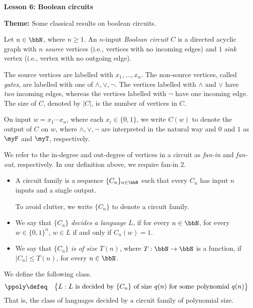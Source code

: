 \documentclass[11pt, a4paper]{article}
\renewcommand{\lesson}{6}
\renewcommand{\lessontitle}{Boolean circuits}
\renewcommand{\fulltitle}{Lesson \lesson: \lessontitle}
\begin{document}
\date{}



\begin{center}
{\Large {\bf \fulltitle}}
\end{center}
\vspace{0.5cm}

\noindent
{\bf Theme:} Some classical results on boolean circuits.

\vspace{0.5cm}


Let $n\in \bbN$, where $n\geq 1$.
An $n$-input {\em Boolean circuit} $C$ is a directed acyclic graph with
$n$ {\em source} vertices (i.e., vertices with no incoming edges) and 
$1$ {\em sink} vertex (i.e., vertex with no outgoing edge).

The source vertices are labelled with $x_1,\ldots,x_n$.
The non-source vertices, called {\em gates},
are labelled with one of $\wedge, \vee,\neg$.
The vertices labelled with $\wedge$ and $\vee$ have {\em two} incoming edges,
whereas the vertices labelled with $\neg$ have one incoming edge.
The size of $C$, denoted by $|C|$, is the number of vertices in $C$.

On input $w = x_1\cdots x_n$, where each $x_i \in \{0,1\}$,
we write $C(w)$ to denote the output of $C$ on $w$,
where $\wedge,\vee,\neg$ are interpreted in the natural way
and $0$ and $1$ as $\myF$ and $\myT$, respectively.

We refer to the in-degree and out-degree of vertices in a circuit as {\em fan-in} and {\em fan-out}, respectively.
In our definition above, we require fan-in 2.

\begin{itemize}
\item
A circuit family is a sequence $\{C_n\}_{n\in \bbN}$ such that every $C_n$ has input $n$ inputs and a single output.

To avoid clutter, we write $\{C_n\}$ to denote a circuit family.
\item 
We say that {\em $\{C_n\}$ decides a language $L$},
if for every $n\in\bbN$, for every $w\in \{0,1\}^n$, $w\in L$ if and only if $C_n(w)=1$.

\item
We say that {\em $\{C_n\}$ is of size $T(n)$}, where $T:\bbN\to\bbN$ is a function,
if $|C_n|\leq T(n)$, for every $n\in \bbN$.

\end{itemize}
We define the following class.
\begin{eqnarray*}
\ppoly & \defeq &
\big\{L : L \ \text{is decided by}\ \{C_n\} \ \text{of size}\ q(n) \ \text{for some polynomial}\ q(n)\big\} 
\end{eqnarray*}
That is, the class of languages decided by a circuit family of polynomial size.
\end{document}
